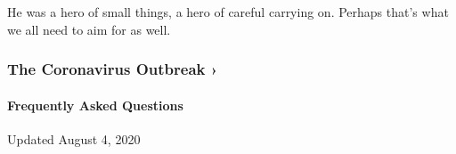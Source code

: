 He was a hero of small things, a hero of careful carrying on. Perhaps
that's what we all need to aim for as well.

\href{https://www.nytimes.com/news-event/coronavirus?action=click\&pgtype=Article\&state=default\&region=MAIN_CONTENT_3\&context=storylines_faq}{}

\hypertarget{the-coronavirus-outbreak-}{%
\subsubsection{The Coronavirus Outbreak
›}\label{the-coronavirus-outbreak-}}

\hypertarget{frequently-asked-questions}{%
\paragraph{Frequently Asked
Questions}\label{frequently-asked-questions}}

Updated August 4, 2020


